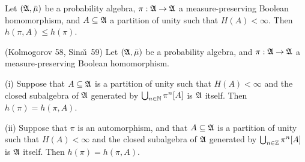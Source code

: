 Let $(\frak A,\bar\mu)$ be a probability algebra,
$\pi:\frak A\to\frak A$ a measure-preserving Boolean homomorphism, and
$A\subseteq \frak A$ a partition of unity such that $H(A)<\infty$.
Then $h(\pi,A)\le h(\pi)$.
     
     
({\smc Kolmogorov 58}, {\smc Sina\v\i\ 59}) Let
$(\frak A,\bar\mu)$ be a probability algebra, and $\pi:\frak A\to\frak
A$ a measure-preserving Boolean homomorphism.
     
(i) Suppose that $A\subseteq\frak A$ is a partition of unity such that
$H(A)<\infty$ and the closed subalgebra of $\frak A$ generated by
$\bigcup_{n\in\Bbb N}\pi^n[A]$ is $\frak A$ itself.   Then
$h(\pi)=h(\pi,A)$.
     
(ii) Suppose that $\pi$ is an automorphism, and that $A\subseteq\frak A$
is a partition of unity such that $H(A)<\infty$ and the closed
subalgebra of $\frak A$ generated by $\bigcup_{n\in\Bbb Z}\pi^n[A]$ is
$\frak A$ itself.   Then $h(\pi)=h(\pi,A)$.
     
